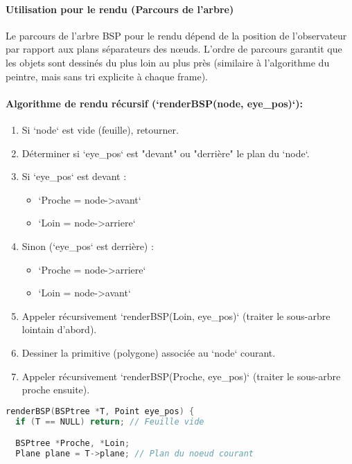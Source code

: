 \documentclass{article}
\begin{document}
{\paragraph{Utilisation pour le rendu (Parcours de l'arbre)}
Le parcours de l'arbre BSP pour le rendu dépend de la position de l'observateur par rapport aux plans séparateurs des nœuds. L'ordre de parcours garantit que les objets sont dessinés du plus loin au plus près (similaire à l'algorithme du peintre, mais sans tri explicite à chaque frame).

\paragraph{Algorithme de rendu récursif (`renderBSP(node, eye_pos)`):}
\begin{enumerate}
    \item Si `node` est vide (feuille), retourner.
    \item Déterminer si `eye_pos` est "devant" ou "derrière" le plan du `node`.
    \item Si `eye_pos` est devant :
        \begin{itemize}
            \item `Proche = node->avant`
            \item `Loin = node->arriere`
        \end{itemize}
    \item Sinon (`eye_pos` est derrière) :
        \begin{itemize}
            \item `Proche = node->arriere`
            \item `Loin = node->avant`
        \end{itemize}
    \item Appeler récursivement `renderBSP(Loin, eye_pos)` (traiter le sous-arbre lointain d'abord).
    \item Dessiner la primitive (polygone) associée au `node` courant.
    \item Appeler récursivement `renderBSP(Proche, eye_pos)` (traiter le sous-arbre proche ensuite).
\end{enumerate}

\begin{lstlisting}[language=C, caption={Pseudo-code du rendu avec un arbre BSP}, label=lst:bsp_render, breaklines=true]
renderBSP(BSPtree *T, Point eye_pos) {
  if (T == NULL) return; // Feuille vide

  BSPtree *Proche, *Loin;
  Plane plane = T->plane; // Plan du noeud courant


\end{lstlisting}}
\end{document}

